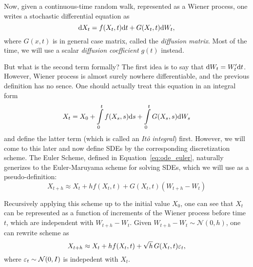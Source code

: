 Now, given a continuous-time random walk, represented as a Wiener process, one writes a stochastic differential equation as
\begin{equation}\label{eq:sde_matrix}
    \mathrm{d} X_t = f(X_t, t)\mathrm{d} t + G(X_t, t)\mathrm{d} W_t,
\end{equation}
where $G(x, t)$ is in general case matrix, called the \emph{diffusion matrix}. Most of the time, we will use a scalar \emph{diffusion coefficient} $g(t)$ instead.

But what is the second term formally? The first idea is to say that $\mathrm{d} W_t = W'_t \mathrm{d} t$. However, Wiener process is almost surely nowhere differentiable, and the previous definition has no sence. One should actually treat this equation in an integral form
\begin{equation}\label{eq:sde_matrix_int}
X_t = X_0 + \int\limits_{0}^{t}f(X_s, s)\mathrm{d} s + \int\limits_{0}^{t}G(X_s, s)\mathrm{d} W_s
\end{equation}
and define the latter term (which is called an \emph{Itô integral}) first. However, we will come to this later and now define SDEs by the corresponding discretization scheme. The Euler Scheme, defined in Equation~\ref{eq:ode_euler}, naturally generizes to the Euler-Maruyama scheme for solving SDEs, which we will use as a pseudo-definition:
\begin{equation}\label{eq:sde_euler_orig}
    X_{t + h} \approx X_t + h f(X_t, t) + G(X_t, t) (W_{t + h} - W_t)
\end{equation}

Recursively applying this scheme up to the initial value $X_0$, one can see that $X_t$ can be represented as a function of increments of the Wiener process before time $t$, which are independent with $W_{t + h} - W_t$. Given $W_{t + h} - W_{t} \sim \mathcal{N}(0, h)$, one can rewrite scheme as
\begin{equation}\label{eq:sde_euelr_maruyama}
    X_{t + h} \approx X_t + h f(X_t, t) + \sqrt{h}\, G(X_t, t)\varepsilon_t,
\end{equation}
where $\varepsilon_t \sim \mathcal{N}(0, I)$ is indepedent with $X_t$. 

